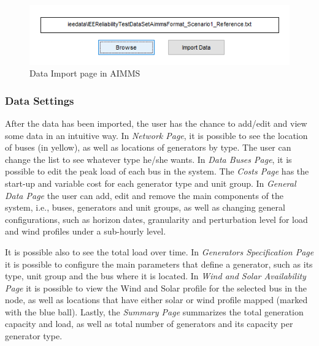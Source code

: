 \documentclass[12pt,LUDisStyle,twosided]{book}
\begin{document}
\begin{figure}[H] 
	\begin{center}
		\includegraphics[keepaspectratio]{aimmsScreenImportPage.png}
	  	\caption{Data Import page in AIMMS}
     	\label{fig:aimmsScreenImportPage}
	\end{center}
\end{figure}

\subsubsection{Data Settings}

After the data has been imported, the user has the chance to add/edit and view some data in an intuitive way. In \textit{Network Page}, it is possible to see the location of buses (in yellow), as well as locations of generators by type. The user can change the list to see whatever type he/she wants. In \textit{Data Buses Page}, it is possible to edit the peak load of each bus in the system. The \textit{Costs Page} has the start-up and variable cost for each generator type and unit group. In \textit{General Data Page} the user can add, edit and remove the main components of the system, i.e., buses, generators and unit groups, as well as changing general configurations, such as horizon dates, granularity and perturbation level for load and wind profiles under a sub-hourly level. 

It is possible also to see the total load over time. In \textit{Generators Specification Page} it is possible to configure the main parameters that define a generator, such as its type, unit group and the bus where it is located. In \textit{Wind and Solar Availability Page} it is possible to view the Wind and Solar profile for the selected bus in the node, as well as locations that have either solar or wind profile mapped (marked with the blue ball). Lastly, the \textit{Summary Page} summarizes the total generation capacity and load, as well as total number of generators and its capacity per generator type.
\end{document}
